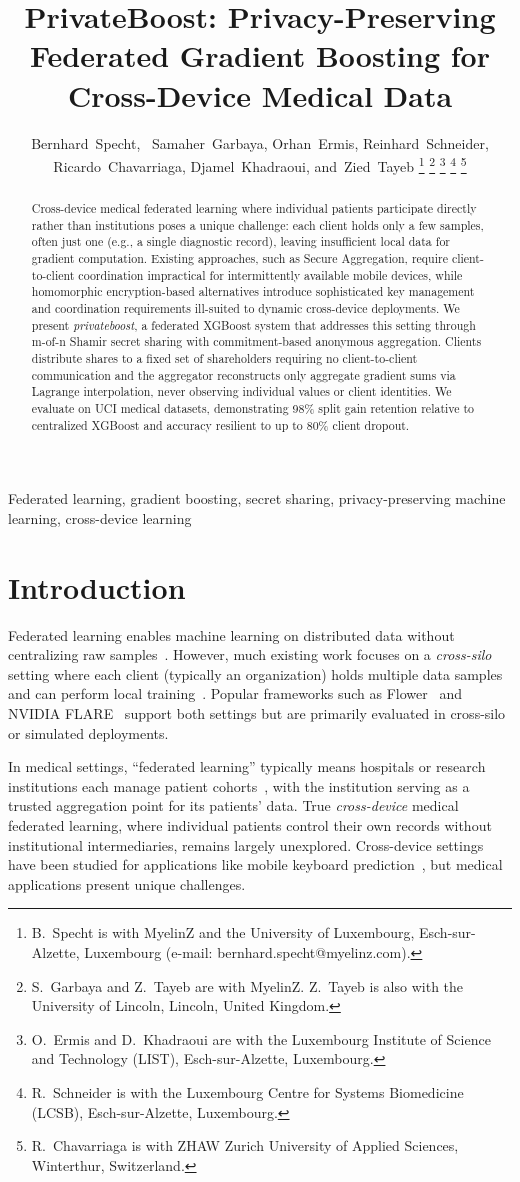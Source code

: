 \documentclass[journal,10pt]{IEEEtran}
\title{PrivateBoost: Privacy-Preserving Federated Gradient Boosting for Cross-Device Medical Data}
\author{Bernhard~Specht,~\IEEEmembership{}
        Samaher~Garbaya,
        Orhan~Ermis,
        Reinhard~Schneider,
        Ricardo~Chavarriaga,
        Djamel~Khadraoui,
        and~Zied~Tayeb%
\thanks{B.~Specht is with MyelinZ and the University of Luxembourg, Esch-sur-Alzette, Luxembourg (e-mail: bernhard.specht@myelinz.com).}%
\thanks{S.~Garbaya and Z.~Tayeb are with MyelinZ. Z.~Tayeb is also with the University of Lincoln, Lincoln, United Kingdom.}%
\thanks{O.~Ermis and D.~Khadraoui are with the Luxembourg Institute of Science and Technology (LIST), Esch-sur-Alzette, Luxembourg.}%
\thanks{R.~Schneider is with the Luxembourg Centre for Systems Biomedicine (LCSB), Esch-sur-Alzette, Luxembourg.}%
\thanks{R.~Chavarriaga is with ZHAW Zurich University of Applied Sciences, Winterthur, Switzerland.}}
\begin{document}
\maketitle

\begin{abstract}
Cross-device medical federated learning where individual patients participate directly rather than institutions poses a unique challenge: each client holds only a few samples, often just one (e.g., a single diagnostic record), leaving insufficient local data for gradient computation. Existing approaches, such as Secure Aggregation, require client-to-client coordination impractical for intermittently available mobile devices, while homomorphic encryption-based alternatives introduce sophisticated key management and coordination requirements ill-suited to dynamic cross-device deployments. We present \textit{privateboost}, a federated XGBoost system that addresses this setting through m-of-n Shamir secret sharing with commitment-based anonymous aggregation. Clients distribute shares to a fixed set of shareholders requiring no client-to-client communication and the aggregator reconstructs only aggregate gradient sums via Lagrange interpolation, never observing individual values or client identities. We evaluate on UCI medical datasets, demonstrating 98\% split gain retention relative to centralized XGBoost and accuracy resilient to up to 80\% client dropout.
\end{abstract}

\begin{IEEEkeywords}
Federated learning, gradient boosting, secret sharing, privacy-preserving machine learning, cross-device learning
\end{IEEEkeywords}

\section{Introduction}

Federated learning enables machine learning on distributed data without centralizing raw samples~\cite{mcmahan2017}. However, much existing work focuses on a \textit{cross-silo} setting where each client (typically an organization) holds multiple data samples and can perform local training~\cite{kairouz2021}. Popular frameworks such as Flower~\cite{beutel2020flower} and NVIDIA FLARE~\cite{roth2022nvidia} support both settings but are primarily evaluated in cross-silo or simulated deployments.

In medical settings, ``federated learning'' typically means hospitals or research institutions each manage patient cohorts~\cite{rieke2020,sheller2020}, with the institution serving as a trusted aggregation point for its patients' data. True \textit{cross-device} medical federated learning, where individual patients control their own records without institutional intermediaries, remains largely unexplored. Cross-device settings have been studied for applications like mobile keyboard prediction~\cite{hard2018}, but medical applications present unique challenges.
\end{document}
